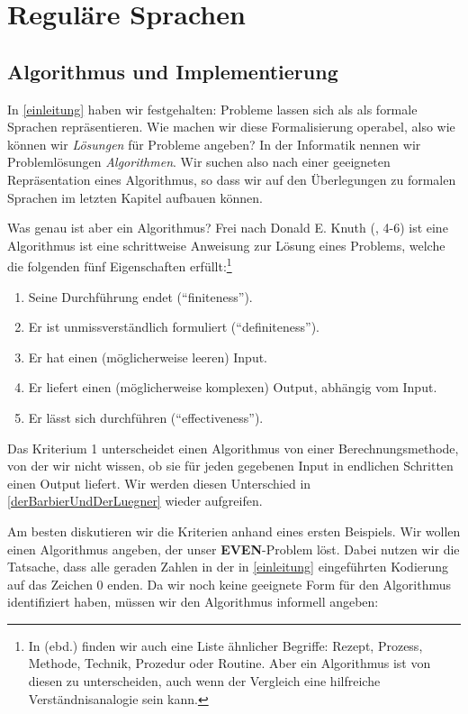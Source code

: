 \chapter{Reguläre Sprachen}

\section{Algorithmus und Implementierung}

In \autoref{einleitung} haben wir festgehalten:
Probleme lassen sich als als formale Sprachen repräsentieren.
Wie machen wir diese Formalisierung operabel,
also wie können wir \emph{Lösungen} für Probleme angeben?
In der Informatik nennen wir Problemlösungen \emph{Algorithmen}.
Wir suchen also nach einer geeigneten Repräsentation eines Algorithmus,
so dass wir auf den Überlegungen zu formalen Sprachen im letzten Kapitel aufbauen können.

Was genau ist aber ein Algorithmus?
Frei nach Donald E. Knuth (\cite{knuth1}, 4-6)
ist eine Algorithmus ist eine schrittweise Anweisung zur Lösung eines Problems,
welche die folgenden fünf Eigenschaften erfüllt:\footnote{
    In \cite{knuth1} (ebd.) finden wir auch eine Liste ähnlicher Begriffe:
    Rezept, Prozess, Methode, Technik, Prozedur oder Routine.
    Aber ein Algorithmus ist von diesen zu unterscheiden,
    auch wenn der Vergleich eine hilfreiche Verständnisanalogie sein kann.
}
\begin{enumerate}
    \item Seine Durchführung endet (``finiteness'').
    \item Er ist unmissverständlich formuliert (``definiteness'').
    \item Er hat einen (möglicherweise leeren) Input.
    \item Er liefert einen (möglicherweise komplexen) Output, abhängig vom Input.
    \item Er lässt sich durchführen (``effectiveness'').
\end{enumerate}

Das Kriterium 1 unterscheidet einen Algorithmus von einer Berechnungsmethode,
von der wir nicht wissen, ob sie für jeden gegebenen Input in endlichen Schritten einen
Output liefert.
Wir werden diesen Unterschied in \autoref{derBarbierUndDerLuegner} wieder aufgreifen.

Am besten diskutieren wir die Kriterien anhand eines ersten Beispiels.
Wir wollen einen Algorithmus angeben, der unser \textbf{EVEN}-Problem löst.
Dabei nutzen wir die Tatsache,
dass alle geraden Zahlen in der in \autoref{einleitung} eingeführten Kodierung
auf das Zeichen 0 enden.
Da wir noch keine geeignete Form für den Algorithmus identifiziert haben,
müssen wir den Algorithmus informell angeben:

